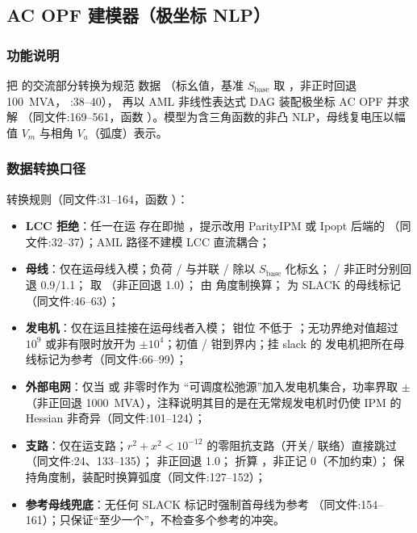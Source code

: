 \subsection{AC OPF 建模器（极坐标 NLP）}\label{subsec:aml-acopf}


\subsubsection*{功能说明}
 把  的交流部分转换为规范
数据 （标幺值，基准 $S_{\mathrm{base}}$ 取
，非正时回退 100~MVA，
:38--40），
 再以 AML 非线性表达式 DAG 装配极坐标 AC OPF 并求解
（同文件:169--561，函数 ）。模型为含三角函数的非凸
NLP，母线复电压以幅值 $V_m$ 与相角 $V_a$（弧度）表示。

\subsubsection*{数据转换口径}
转换规则（同文件:31--164，函数 ）：
\begin{itemize}
  \item \textbf{LCC 拒绝}：任一在运  存在即抛
        ，提示改用 ParityIPM 或 Ipopt 后端的
        （同文件:32--37）；AML 路径不建模 LCC 直流耦合；
  \item \textbf{母线}：仅在运母线入模；负荷 / 与并联
        / 除以 $S_{\mathrm{base}}$ 化标幺；
        / 非正时分别回退 0.9/1.1； 取
        （非正回退 1.0）； 由  角度制换算；
         为 SLACK 的母线标记 （同文件:46--63）；
  \item \textbf{发电机}：仅在运且挂接在运母线者入模； 钳位
        不低于 ；无功界绝对值超过 $10^{9}$ 或非有限时放开为
        $\pm 10^{4}$；初值 / 钳到界内；挂 slack 的
        发电机把所在母线标记为参考（同文件:66--99）；
  \item \textbf{外部电网}：仅当  或  非零时作为
        “可调度松弛源”加入发电机集合，功率界取 $\pm$
        （非正回退 1000~MVA），注释说明其目的是在无常规发电机时仍使 IPM 的
        Hessian 非奇异（同文件:101--124）；
  \item \textbf{支路}：仅在运支路；$r^{2}+x^{2}<10^{-12}$ 的零阻抗支路（开关/
        联络）直接跳过（同文件:24、133--135）； 非正回退 1.0；
         折算 ，非正记 0（不加约束）；
         保持角度制，装配时换算弧度（同文件:127--152）；
  \item \textbf{参考母线兜底}：无任何 SLACK 标记时强制首母线为参考
        （同文件:154--161）；只保证“至少一个”，不检查多个参考的冲突。
\end{itemize}

